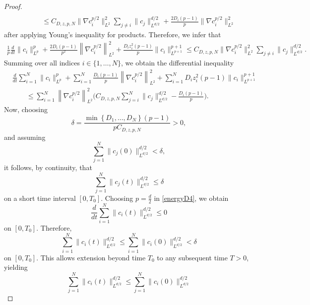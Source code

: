 \documentclass[11pt,reqno]{amsart}
\newcommand{\be}{\begin{equation}}
\newcommand{\ee}{\end{equation}}
\begin{document}
\begin{proof}
\begin{align}
\\&\quad\quad\leq C_{D,z,p, N}\|\nabla c_i^{p/2}\|^2_{L^2}\sum_{j\neq i} \|c_j\|_{L^{d/2}}^{d/2} + \frac{2D_i(p-1)}{p}\|\nabla c_i^{p/2}\|^2_{L^2}
\end{align} after applying Young's inequality for products.
Therefore, we infer that 
\begin{align}\label{energyD3}
\frac{1}{p} \frac{d}{dt} \|c_i\|_{L^p}^p + \frac{2D_i(p-1)}{p^2} \left\| \nabla c_i^{p/2} \right\|_{L^2}^2 + \frac{D_i z_i^2(p-1)}{p}\|c_i\|_{L^{p+1}}^{p+1} \leq C_{D, z,  p, N}\|\nabla c_i^{p/2}\|^2_{L^2}\sum_{j\neq i} \|c_j\|_{L^{d/2}}^{d/2}.
\end{align}
Summing over all indices $i\in\{1, \dots, N\}$, we obtain the differential inequality 
\be 
\begin{aligned}\label{energyD4}
&\frac{d}{dt} \sum_{i=1}^N \|c_i\|_{L^p}^p + \sum\limits_{i=1}^{N} \frac{D_i(p-1)}{p} \left\| \nabla c_i^{p/2} \right\|_{L^2}^2 + \sum\limits_{i=1}^{N} {D_i z_i^2(p-1)}\|c_i\|_{L^{p+1}}^{p+1}   
\\&\quad\quad\leq \sum_{i=1}^N \left\| \nabla c_i^{p/2} \right\|_{L^2}^2\bigg(C_{D, z,  p, N} \sum_{j = i}^N \|c_j\|_{L^{d/2}}^{d/2} - \frac{D_i(p-1)}{p}\bigg).
\end{aligned}
\ee 
Now, choosing
\begin{equation}
\delta = \frac{ \min \left\{D_1, \dots, D_N\right\}(p-1)}{p C_{D, z,  p, N}} >0 ,
\end{equation}
and assuming
\begin{equation}\label{smallness}
\sum_{j=1}^{N}\|c_j(0)\|_{L^{d/2}}^{d/2} < \delta,
\end{equation}
it follows, by continuity, that 
\begin{equation}
\sum_{j=1}^{N}\|c_j(t)\|_{L^{d/2}}^{d/2} \le \delta
\end{equation} on a short time interval $[0, T_0]$. 
Choosing $p=\frac d2$ in \eqref{energyD4}, we obtain
\begin{equation}
\frac{d}{dt} \sum_{i=1}^{N} \|c_i(t)\|_{L^{d/2}}^{d/2} \leq 0
\end{equation} on $[0,T_0]$. 
Therefore,
\begin{equation}
\sum_{i=1}^{N} \|c_i(t)\|_{L^{d/2}}^{d/2} \leq \sum_{i=1}^{N} \|c_i(0)\|_{L^{d/2}}^{d/2} <\delta
\end{equation} on $[0,T_0]$. This allows extension beyond time $T_0$ to any subsequent time $T>0$, yielding 
\begin{equation}
\sum_{j=1}^{N}\|c_i(t)\|_{L^{d/2}}^{d/2} \leq \sum_{j=1}^{N} \|c_i(0)\|_{L^{d/2}}^{d/2}

\end{equation}
\end{proof}
\end{document}
